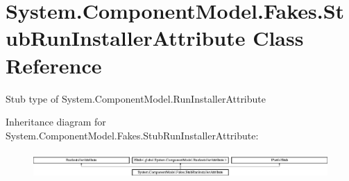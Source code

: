 \hypertarget{class_system_1_1_component_model_1_1_fakes_1_1_stub_run_installer_attribute}{\section{System.\-Component\-Model.\-Fakes.\-Stub\-Run\-Installer\-Attribute Class Reference}
\label{class_system_1_1_component_model_1_1_fakes_1_1_stub_run_installer_attribute}
}


Stub type of System.\-Component\-Model.\-Run\-Installer\-Attribute 


Inheritance diagram for System.\-Component\-Model.\-Fakes.\-Stub\-Run\-Installer\-Attribute\-:\begin{figure}[H]
\begin{center}
\leavevmode
\includegraphics[height=1.011743cm]{class_system_1_1_component_model_1_1_fakes_1_1_stub_run_installer_attribute}
\end{center}
\end{figure}
